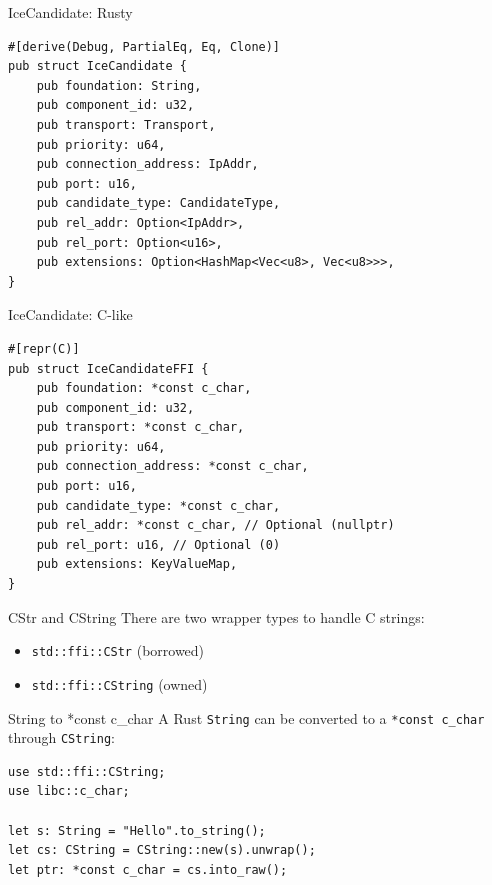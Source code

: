 \documentclass[aspectratio=1610,14pt,t]{beamer}
\begin{document}
\begin{frame}[c,fragile]{IceCandidate: Rusty}
  \begin{verbatim}
#[derive(Debug, PartialEq, Eq, Clone)]
pub struct IceCandidate {
    pub foundation: String,
    pub component_id: u32,
    pub transport: Transport,
    pub priority: u64,
    pub connection_address: IpAddr,
    pub port: u16,
    pub candidate_type: CandidateType,
    pub rel_addr: Option<IpAddr>,
    pub rel_port: Option<u16>,
    pub extensions: Option<HashMap<Vec<u8>, Vec<u8>>>,
}
  \end{verbatim}
\end{frame}

\begin{frame}[c,fragile]{IceCandidate: C-like}
  \begin{verbatim}
#[repr(C)]
pub struct IceCandidateFFI {
    pub foundation: *const c_char,
    pub component_id: u32,
    pub transport: *const c_char,
    pub priority: u64,
    pub connection_address: *const c_char,
    pub port: u16,
    pub candidate_type: *const c_char,
    pub rel_addr: *const c_char, // Optional (nullptr)
    pub rel_port: u16, // Optional (0)
    pub extensions: KeyValueMap,
}
  \end{verbatim}
\end{frame}

\begin{frame}[c]{CStr and CString}
  There are two wrapper types to handle C strings:

  \begin{itemize}
    \item \texttt{std::ffi::CStr} (borrowed)
    \item \texttt{std::ffi::CString} (owned)
  \end{itemize}
\end{frame}

\begin{frame}[c,fragile]{String to *const c\_char}
  A Rust \texttt{String} can be converted to a \texttt{*const c\_char} through
  \texttt{CString}:

  \begin{verbatim}
use std::ffi::CString;
use libc::c_char;

let s: String = "Hello".to_string();
let cs: CString = CString::new(s).unwrap();
let ptr: *const c_char = cs.into_raw();
  \end{verbatim}
\end{frame}
\end{document}
